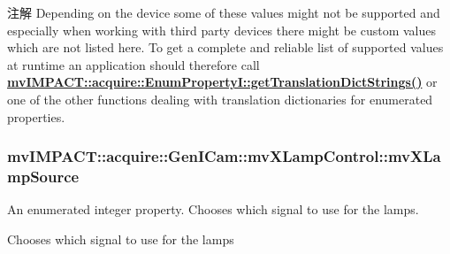 \begin{DoxyNote}{注解}
Depending on the device some of these values might not be supported and especially when working with third party devices there might be custom values which are not listed here. To get a complete and reliable list of supported values at runtime an application should therefore call {\bfseries \hyperlink{classmv_i_m_p_a_c_t_1_1acquire_1_1_enum_property_i_a0ba6ccbf5ee69784d5d0b537924d26b6}{mv\+I\+M\+P\+A\+C\+T\+::acquire\+::\+Enum\+Property\+I\+::get\+Translation\+Dict\+Strings()}} or one of the other functions dealing with translation dictionaries for enumerated properties. 
\end{DoxyNote}
\hypertarget{classmv_i_m_p_a_c_t_1_1acquire_1_1_gen_i_cam_1_1mv_x_lamp_control_ab98091804bbf306399046be4543ebb48}{
\subsubsection[{mv\+X\+Lamp\+Source}]{ mv\+I\+M\+P\+A\+C\+T\+::acquire\+::\+Gen\+I\+Cam\+::mv\+X\+Lamp\+Control\+::mv\+X\+Lamp\+Source}}\label{classmv_i_m_p_a_c_t_1_1acquire_1_1_gen_i_cam_1_1mv_x_lamp_control_ab98091804bbf306399046be4543ebb48}


An enumerated integer property. Chooses which signal to use for the lamps. 

Chooses which signal to use for the lamps

